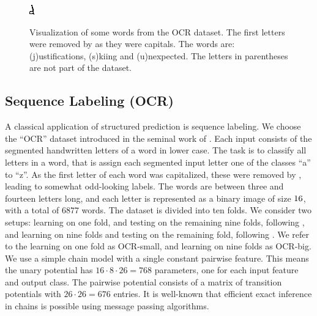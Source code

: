 \begin{figure}
    \includegraphics[width=.068\linewidth, frame]{evaluation/images/unexpected_08}\\
    \caption{%
        Visualization of some words from the OCR dataset. The first letters were removed by \citet{taskar2003max} as 
        they were capitals.
        The words are: (j)ustifications, (s)kiing and (u)nexpected. The letters in parentheses are not part of the dataset.
    }
\end{figure}
\subsection{Sequence Labeling (OCR)}
A classical application of structured prediction is sequence labeling.
We choose the ``OCR'' dataset introduced in the seminal work of \citet{taskar2003max}.
Each input consists of the segmented handwritten letters of a word in lower
case. The task is to classify all letters in a word, that is assign each
segmented input letter one of the classes ``a'' to ``z''. As the first letter
of each word was capitalized, these were removed by \citet{taskar2003max},
leading to somewhat odd-looking labels. The words are between three and fourteen
letters long, and each letter is represented as a binary image of size $16
\time 8$, with a total of $6877$ words.
The dataset is divided into ten folds. We consider two setups: learning
on one fold, and testing on the remaining nine folds, following \citet{taskar2003max},
and learning on nine folds and testing on the remaining fold, following \citet{lacoste}.
We refer to the learning on one fold as OCR-small, and learning on nine folds as OCR-big.
We use a simple chain model with a single constant pairwise feature.
This means the unary potential has $16 \cdot 8 \cdot 26 = 768$ parameters, one for each input
feature and output class. The pairwise potential consists of a matrix of
transition potentials with $26 \cdot 26=676$ entries.
It is well-known that efficient exact inference in chains is possible using
message passing algorithms. 


